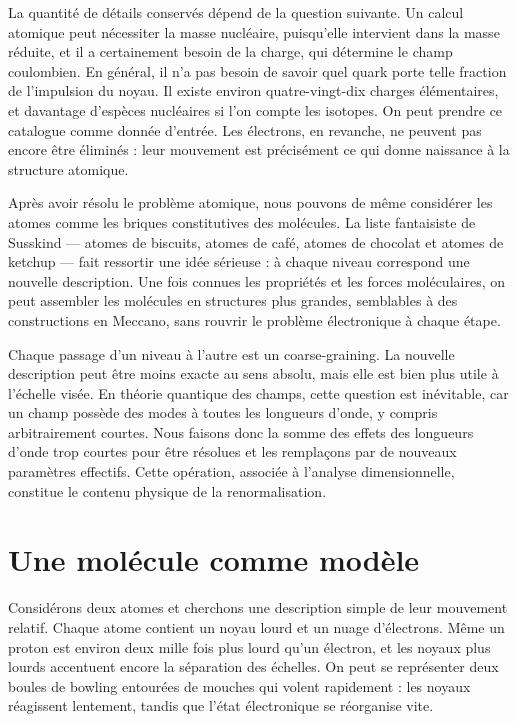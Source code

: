 La quantité de détails conservés dépend de la question suivante. Un calcul atomique peut nécessiter la masse nucléaire, puisqu’elle intervient dans la masse réduite, et il a certainement besoin de la charge, qui détermine le champ coulombien. En général, il n’a pas besoin de savoir quel quark porte telle fraction de l’impulsion du noyau. Il existe environ quatre-vingt-dix charges élémentaires, et davantage d’espèces nucléaires si l’on compte les isotopes. On peut prendre ce catalogue comme donnée d’entrée. Les électrons, en revanche, ne peuvent pas encore être éliminés : leur mouvement est précisément ce qui donne naissance à la structure atomique.

Après avoir résolu le problème atomique, nous pouvons de même considérer les atomes comme les briques constitutives des molécules. La liste fantaisiste de Susskind — atomes de biscuits, atomes de café, atomes de chocolat et atomes de ketchup — fait ressortir une idée sérieuse : à chaque niveau correspond une nouvelle description. Une fois connues les propriétés et les forces moléculaires, on peut assembler les molécules en structures plus grandes, semblables à des constructions en Meccano, sans rouvrir le problème électronique à chaque étape.

Chaque passage d’un niveau à l’autre est un coarse-graining. La nouvelle description peut être moins exacte au sens absolu, mais elle est bien plus utile à l’échelle visée. En théorie quantique des champs, cette question est inévitable, car un champ possède des modes à toutes les longueurs d’onde, y compris arbitrairement courtes. Nous faisons donc la somme des effets des longueurs d’onde trop courtes pour être résolues et les remplaçons par de nouveaux paramètres effectifs. Cette opération, associée à l’analyse dimensionnelle, constitue le contenu physique de la renormalisation.

\section{Une molécule comme modèle}

Considérons deux atomes et cherchons une description simple de leur mouvement relatif. Chaque atome contient un noyau lourd et un nuage d’électrons. Même un proton est environ deux mille fois plus lourd qu’un électron, et les noyaux plus lourds accentuent encore la séparation des échelles. On peut se représenter deux boules de bowling entourées de mouches qui volent rapidement : les noyaux réagissent lentement, tandis que l’état électronique se réorganise vite.

